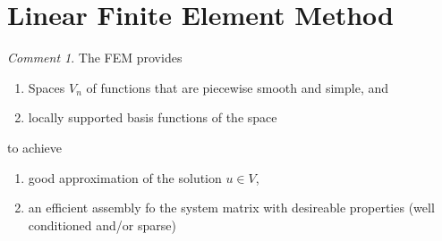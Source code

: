 \documentclass[english]{article}
\theoremstyle{definition}
\theoremstyle{remark}
\newtheorem*{comm}{Comment}
\begin{document}
\section{Linear Finite Element Method}
\begin{comm}
  The FEM provides
  \begin{enumerate}
  \item Spaces $V_n$ of functions that are piecewise smooth and simple, and
  \item locally supported basis functions of the space
  \end{enumerate}
  to achieve
  \begin{enumerate}
  \item good approximation of the solution $u \in V$,
  \item an efficient assembly fo the system matrix with desireable properties (well conditioned and/or sparse)
  \end{enumerate}
\end{comm}
\end{document}
